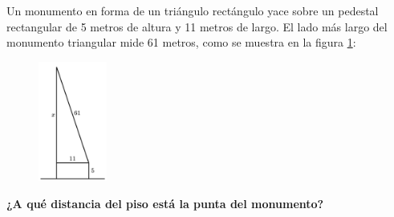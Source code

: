 Un monumento en forma de un triángulo rectángulo yace sobre un pedestal rectangular de 5 metros de altura y 11 metros de largo.
El lado más largo del monumento triangular mide 61 metros, como se muestra en la figura \ref{fig:des_pitagoras_06}:

\begin{figure}[H]
    \begin{center}
        \includegraphics[width=0.2\textwidth]{../images/des_pitagoras_06.png}
    \end{center}
    \caption{}
    \label{fig:des_pitagoras_06}
\end{figure}

\textbf{¿A qué distancia del piso está la punta del monumento?}
